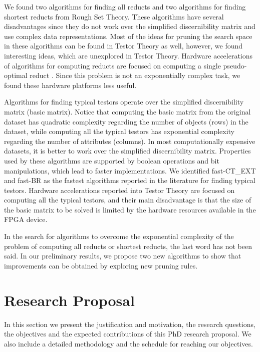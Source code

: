 \documentclass[authoryear,11pt]{elsarticle}
\begin{document}
  We found two algorithms for finding all reducts \citep{Starzyk00,WangP07} and two algorithms for finding 
  shortest reducts \citep{Lin04,Jensen14} from Rough Set Theory. These algorithms have several disadvantages 
  since they do not work over the simplified discernibility matrix and use complex data representations. 
  Most of the ideas for pruning the search space in these algorithms can be found in Testor Theory as well, 
  however, we found interesting ideas, which are unexplored in Testor Theory.
  Hardware accelerations of algorithms for computing reducts are focused on computing a single pseudo-optimal
  reduct \citep{Tiwari11,Tiwari12,Tiwari13,Grzes13,Kopczynski14,Tiwari14}. Since this problem is not an 
  exponentially complex task, we found these hardware platforms less useful.
  
  Algorithms for finding typical testors operate over the simplified discernibility matrix (basic matrix). Notice
  that computing the basic matrix from the original dataset has quadratic complexity regarding the number of
  objects (rows) in the dataset, while computing all the typical testors has exponential complexity regarding the
  number of attributes (columns). 
  In most computationally expensive datasets, it is better to work over the simplified discernibility matrix. 
  Properties used by these algorithms are supported by boolean operations and bit manipulations, which lead to
  faster implementations. We identified fast-CT\_EXT \citep{Sanchez10} and fast-BR \citep{Lias13} as the fastest
  algorithms reported in the literature for finding typical testors. Hardware accelerations reported into Testor
  Theory \citep{Cumplido06,Rojas07,Rojas12} are focused on computing all the typical testors, and their main
  disadvantage is  that the size of the basic matrix to be solved is limited by the hardware resources available 
  in the FPGA device.
  
  In the search for algorithms to overcome the exponential complexity of the problem of computing all reducts or
  shortest reducts, the last word has not been said. In our preliminary results, we propose 
  two new algorithms to show that improvements can be obtained by exploring new pruning rules.

\section{Research Proposal}\label{ResearchProposal} 
 In this section we present the justification and motivation, the research questions, the objectives and the
 expected contributions of this PhD research proposal. We also include a detailed methodology and the schedule 
 for reaching our objectives.
\end{document}
